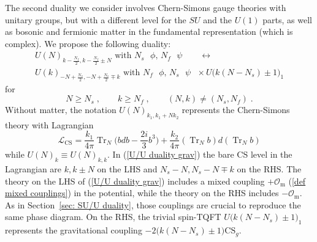 \documentclass[a4paper, 12pt]{article}
\numberwithin{equation}{section}
\newcommand{\be}{\begin{equation}} \newcommand{\ee}{\end{equation}}
\newcommand{\cL}{\mathcal{L}}
\newcommand{\cO}{\mathcal{O}}
\DeclareMathOperator{\Tr}{Tr}
\begin{document}
The second duality we consider involves Chern-Simons gauge theories with unitary groups, but with a different level for the $SU$ and the $U(1)$ parts, as well as bosonic and fermionic matter in the fundamental representation (which is complex). We propose the following duality:
\begin{multline}
\label{U/U duality grav}
U(N)_{k - \frac{N_f}2, k - \frac{N_f}2 \pm N} \text{ with $N_s$ $\phi$, $N_f$ $\psi$} \qquad\longleftrightarrow \\
U(k)_{-N + \frac{N_s}2, -N + \frac{N_s}2 \mp k } \text{ with $N_f$ $\phi$, $N_s$ $\psi$ } \times U\big( k(N-N_s) \pm 1 \big)_1
\end{multline}
for
\be
\label{U/U duality range}
N \geq N_s \;,\qquad k \geq N_f \;,\qquad (N,k) \neq (N_s, N_f) \;.
\ee
Without matter, the notation $U(N)_{k_1, k_1 + Nk_2}$ represents the Chern-Simons theory with Lagrangian
\be
\label{U_k1,k2 Lagrangian}
\cL_\text{CS} = \frac{k_1}{4\pi} \Tr_N \Big( bdb - \frac{2i}3 b^3 \Big) + \frac{k_2}{4\pi} (\Tr_N b) d (\Tr_N b)
\ee
while $U(N)_k \equiv U(N)_{k,k}$. In (\ref{U/U duality grav}) the bare CS level in the Lagrangian are $k, k\pm N$ on the LHS and $N_s-N, N_s-N\mp k$ on the RHS. The theory on the LHS of (\ref{U/U duality grav}) includes a mixed coupling $+\cO_\text{m}$ (\ref{def mixed couplings}) in the potential, while the theory on the RHS includes $-\cO_\text{m}$. As in Section~\ref{sec: SU/U duality}, those couplings are crucial to reproduce the same phase diagram. On the RHS, the trivial spin-TQFT $U\big(k(N - N_s) \pm1 \big)_1$ represents the gravitational coupling $-2\big( k(N-N_s) \pm1\big) \text{CS}_g$.
\end{document}
